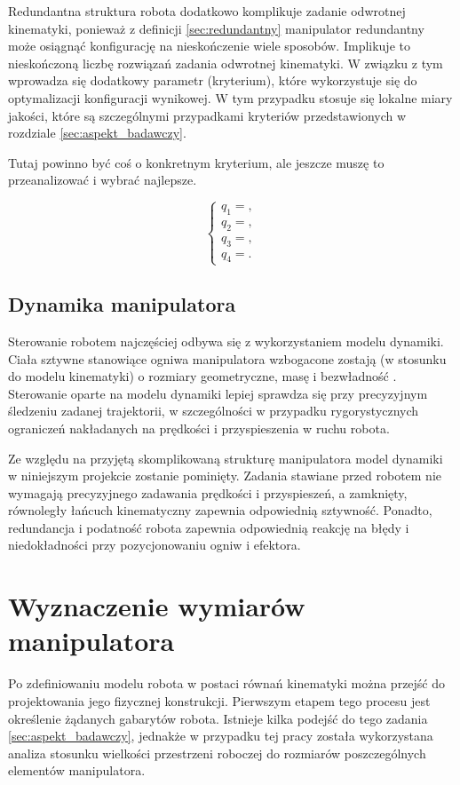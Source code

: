 \documentclass[printmode]{mgr}
\begin{document}
Redundantna struktura robota dodatkowo komplikuje zadanie odwrotnej kinematyki, ponieważ z definicji \ref{sec:redundantny}
manipulator redundantny może osiągnąć konfigurację na nieskończenie wiele sposobów. Implikuje to nieskończoną
liczbę rozwiązań zadania odwrotnej kinematyki. W związku z tym wprowadza się dodatkowy parametr (kryterium), które
wykorzystuje się do optymalizacji konfiguracji wynikowej. W tym przypadku stosuje się lokalne miary jakości, które są szczególnymi
przypadkami kryteriów przedstawionych w rozdziale \ref{sec:aspekt_badawczy}. 

Tutaj powinno być coś o konkretnym kryterium, ale jeszcze muszę to przeanalizować i wybrać najlepsze.

\begin{equation}
\begin{cases}
q_1 = ,\\
q_2 = ,\\
q_3 = ,\\
q_4 = .
\end{cases}
\label{eq:odwrotna_kinematyka}
\end{equation}

\section{Dynamika manipulatora}
Sterowanie robotem najczęściej odbywa się z wykorzystaniem modelu dynamiki. Ciała sztywne stanowiące ogniwa
manipulatora wzbogacone zostają (w stosunku do modelu kinematyki) o rozmiary geometryczne, masę i bezwładność \cite{podstawy_robotyki}.
Sterowanie oparte na modelu dynamiki lepiej sprawdza się przy precyzyjnym śledzeniu zadanej trajektorii, w szczególności
w przypadku rygorystycznych ograniczeń nakładanych na prędkości i przyspieszenia w ruchu robota. 

Ze względu na przyjętą skomplikowaną strukturę manipulatora model dynamiki w niniejszym projekcie zostanie pominięty. Zadania stawiane
przed robotem nie wymagają precyzyjnego zadawania prędkości i przyspieszeń, a zamknięty, równoległy łańcuch kinematyczny
zapewnia odpowiednią sztywność. Ponadto, redundancja i podatność robota zapewnia odpowiednią reakcję na błędy i niedokładności
przy pozycjonowaniu ogniw i efektora.


\chapter{Wyznaczenie wymiarów manipulatora}\label{sec:wyznaczenie_wymiarow_manipulatora}
Po zdefiniowaniu modelu robota w postaci równań kinematyki można przejść do projektowania
jego fizycznej konstrukcji. Pierwszym etapem tego procesu jest określenie żądanych gabarytów
robota. Istnieje kilka podejść do tego zadania \ref{sec:aspekt_badawczy}, jednakże w przypadku tej pracy została
wykorzystana analiza stosunku wielkości przestrzeni roboczej do rozmiarów poszczególnych
elementów manipulatora.
\end{document}

